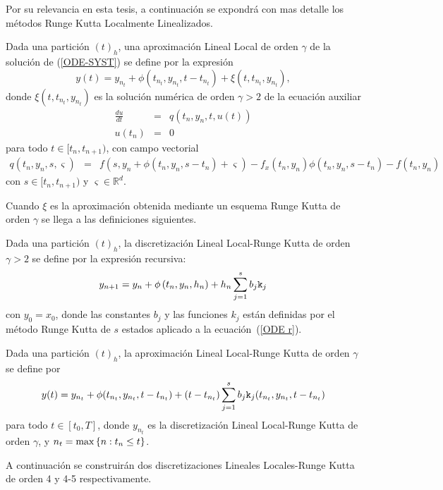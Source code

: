 Por su relevancia en esta tesis, a continuación se expondrá con mas detalle los métodos Runge Kutta Localmente Linealizados. 

Dada una partición $(t)_{h}$, una aproximación Lineal Local de orden $%
\gamma$ de la solución de (\ref{ODE-SYST}) se define por la expresión 
\begin{equation}
y(t)=y_{n_{t}}+\phi(t_{n_{t}},y_{n_{t}},t-t_{n_{t}})+\xi(t,t_{n_{t}},y_{n_{t}}),
\label{ODE-REV-HOLL}
\end{equation}
donde $\xi(t,t_{n_{t}},y_{n_{t}})$ es la solución numérica de orden $\gamma >2$ de la ecuación auxiliar
\begin{eqnarray}
\frac{du}{dt} & = & q(t_{n},y_{n},t,u(t))  \label{ODE r} \\
u(t_{n}) & = & 0 \nonumber
\end{eqnarray}
para todo $t\in [t_{n},t_{n+1})$, con campo vectorial 
\begin{eqnarray*}
q(t_n,y_n,s,\varsigma)&=&f(s,y_n+\phi(t_n,y_n,s-t_n)+\varsigma)-f_x(t_n,y_n)\phi(t_n,y_n,s-t_n)-f(t_n,y_n)%
\end{eqnarray*}
con $s\in [t_{n},t_{n+1})$ y $\varsigma \in \mathbb{R}^d $. 

Cuando $\xi$ es la aproximación obtenida mediante un esquema Runge Kutta de orden $\gamma$ se llega a las definiciones siguientes.
\begin{definition}
	\label{definition HLLD} \cite{Jimenez13} Dada una partición $(t)_{h}$, la discretización Lineal Local-Runge Kutta 
    de orden $\gamma >2$ se define por la expresión recursiva:
	\begin{equation*}
	y_{n+1}=y_{n}+\phi \left( t_{n},y_{n},h_{n}\right) +h_{n}\sum_{j=1}^{s}b_{j}\mathtt{k}_{j}
	\end{equation*}%
	con $y_{0}=x_{0}$, donde las constantes $b_{j}$ y las funciones $k_{j}$ están definidas por el método Runge Kutta de $s$ estados aplicado a la ecuación~(\ref{ODE r}).
\end{definition}

\begin{definition}
	\label{definition HOLLA} \cite{Jimenez13} Dada una partición $(t)_{h}$, la aproximación Lineal Local-Runge Kutta de orden $\gamma$ se define por 
	\begin{equation*}
	y(t)=y_{n_{t}}+\phi(t_{n_{t}},y_{n_{t}},t-t_{n_{t}})+(t-t_{n_{t}})%
	\sum_{j=1}^{s}b_{j}\kt_{j}(t_{n_{t}},y_{n_{t}},t-t_{n_{t}}) %
	\end{equation*}
	para todo $t\in[t_{0},T]$, donde $y_{n_{t}}$ es la discretización Lineal Local-Runge Kutta de orden $\gamma$, y $n_{t}=\max\left\{ n:t_{n}\leq t \right\}$.
\end{definition}
A continuación se construirán dos discretizaciones Lineales Locales-Runge Kutta de orden 4 y 4-5 respectivamente.

